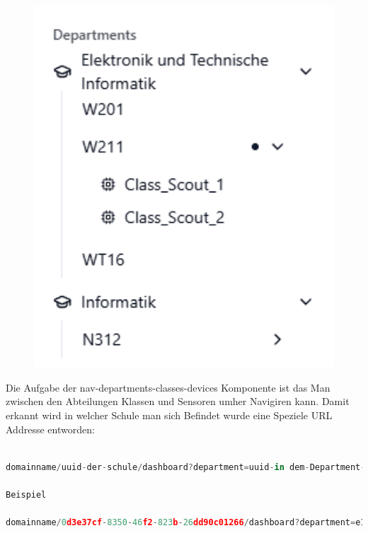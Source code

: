 \begin{inhalt}
\begin{figure}[!htb]
\centering
\includegraphics[width=1\textwidth]{files/Thomas/pics/Website/Sidebar/nav-departments-classes-devices/nav-screen.png}
\caption[Bildbezeichnung für Abbildungsverzeichnis]{}
\label{fig:gehaeuse_internet_bild}
\end{figure}

\clearpage


Die Aufgabe der nav-departments-classes-devices Komponente ist das Man zwischen den Abteilungen Klassen und Sensoren umher Navigiren kann. Damit erkannt wird in welcher Schule man sich Befindet wurde eine Speziele URL Addresse entworden:

\begin{lstlisting}[language=TypeScript]

domainname/uuid-der-schule/dashboard?department=uuid-in dem-Department-man-gerae-ist&class=uuid-in-welcher-Klasse-man-sich-gerade befindet&device=device-uuid

Beispiel

domainname/0d3e37cf-8350-46f2-823b-26dd90c01266/dashboard?department=e1ed2bd8-4c9c-40f8-bec7-4edcebe59fc1&class=eb4355fd-1e98-4961-be62-36fa9fc5cec0&device=a52eb8dc-5df5-475a-8a9f-f5f5a24ac2d3
\end{lstlisting}



\end{inhalt}
